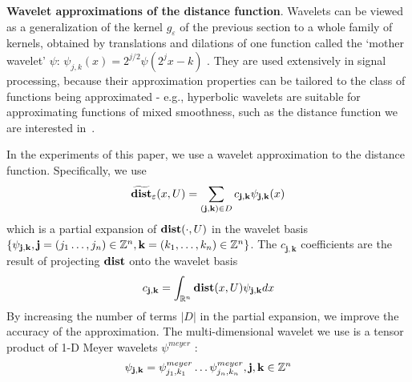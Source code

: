
\textbf{Wavelet approximations of the distance function}. Wavelets can be viewed as a generalization of the kernel $g_\varepsilon$ of the previous section to a whole family of kernels, obtained by translations and dilations of one function called the `mother wavelet' $\psi$: $\psi_{j,k}(x) = 2^{j/2}\psi(2^jx - k)$  \cite{MallatBook}.
They are used extensively in signal processing, because their approximation properties can be tailored to the class of functions being approximated - e.g., hyperbolic wavelets are suitable for approximating functions of mixed smoothness, such as the distance function we are interested in~\cite{Heping04_HyperbolicWav}.

In the experiments of this paper, we use a wavelet approximation to the distance function.
Specifically, we use
\[\widetilde{\mathbf{dist}}_\varepsilon(x,U) =  \sum_{\mathbf{(j,k)} \in D}c_{\mathbf{j,k}}\psi_{\mathbf{j,k}}(x)\]
which is a partial expansion of $\mathbf{dist}(\cdot,U)$ in the wavelet basis $\{\psi_{\mathbf{j,k}}, \mathbf{j} = (j_1\ldots,j_n) \in \mathbb{Z}^n, \mathbf{k} = (k_1,\ldots,k_n) \in \mathbb{Z}^n\}$.
The $c_{\mathbf{j,k}}$ coefficients are the result of projecting $\mathbf{dist}$ onto the wavelet basis
\[ c_{\mathbf{j,k}} = \int_{\mathbb{R}^n}\mathbf{dist}(x,U)\psi_{\mathbf{j,k}}dx\]
By increasing the number of terms $|D|$ in the partial expansion, we improve the accuracy of the approximation.
The multi-dimensional wavelet we use is a tensor product of 1-D Meyer wavelets $\psi^{meyer}$ \cite{MallatBook}:
\begin{equation}
\label{eq:multid meyer}
\psi_{\mathbf{j,k}} = \psi_{j_1,k_1}^{meyer}\ldots \psi_{j_n,k_n}^{meyer}, \mathbf{j,k} \in \mathbb{Z}^n
\end{equation}

 
